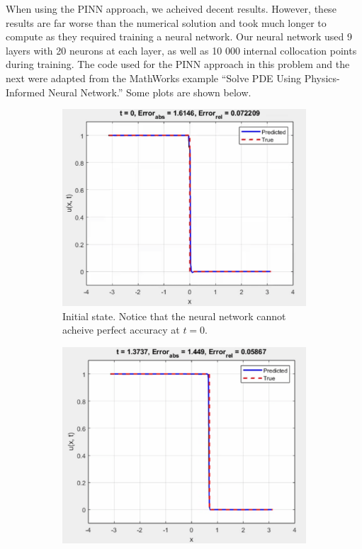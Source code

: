 \documentclass{myproject}
\begin{document}
When using the PINN approach, we acheived decent results. However, these results are far worse than the numerical solution and took much longer to compute as they required training a neural network. Our neural network used 9 layers with 20 neurons at each layer, as well as 10 000 internal collocation points during training. The code used for the PINN approach in this problem and the next were adapted from the MathWorks example ``Solve PDE Using Physics-Informed Neural Network.'' Some plots are shown below.

\begin{figure}
\centering
    \begin{subfigure}{.48\textwidth}
        \centering
        \includegraphics[width=1.0\textwidth]{t0_NN_shockwave.png}
        \caption{Initial state. Notice that the neural network cannot acheive perfect accuracy at $t=0$.}
    \end{subfigure}\hfill
    \begin{subfigure}{.48\textwidth}
        \centering
        \includegraphics[width=1\textwidth]{t137_NN_shockwave.png}

\end{subfigure}
\end{figure}
\end{document}
